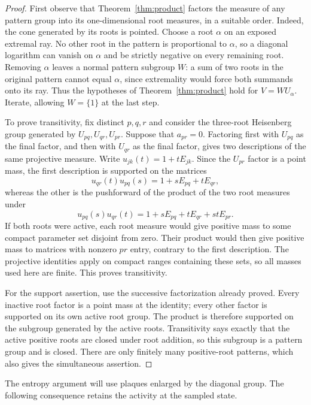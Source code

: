 \begin{proof}
First observe that Theorem~\ref{thm:product} factors the measure of any
pattern group into its one-dimensional root measures, in a suitable
order.  Indeed, the cone generated by its roots is pointed.  Choose a
root $\alpha$ on an exposed extremal ray.  No other root in the pattern
is proportional to $\alpha$, so a diagonal logarithm can vanish on
$\alpha$ and be strictly negative on every remaining root.  Removing
$\alpha$ leaves a normal pattern subgroup $W$: a sum of two roots in
the original pattern cannot equal $\alpha$, since extremality would
force both summands onto its ray.  Thus the hypotheses of
Theorem~\ref{thm:product} hold for $V=WU_\alpha$.  Iterate, allowing
$W=\{1\}$ at the last step.

To prove transitivity, fix distinct $p,q,r$ and consider the
three-root Heisenberg group generated by $U_{pq},U_{qr},U_{pr}$.
Suppose that $a_{pr}=0$.  Factoring first with $U_{pq}$ as the final
factor, and then with $U_{qr}$ as the final factor, gives two
descriptions of the same projective measure.  Write
$u_{jk}(t)=1+tE_{jk}$.  Since the $U_{pr}$ factor is a point mass, the
first description is supported on the matrices
\[
 u_{qr}(t)u_{pq}(s)=1+sE_{pq}+tE_{qr},
\]
whereas the other is the pushforward of the product of the two root
measures under
\[
 u_{pq}(s)u_{qr}(t)
     =1+sE_{pq}+tE_{qr}+stE_{pr}.
\]
If both roots were active, each root measure would give positive mass
to some compact parameter set disjoint from zero.  Their product would
then give positive mass to matrices with nonzero $pr$ entry, contrary
to the first description.  The projective identities apply on compact
ranges containing these sets, so all masses used here are finite.
This proves transitivity.

For the support assertion, use the successive factorization already
proved.  Every inactive root factor is a point mass at the identity;
every other factor is supported on its own active root group.  The
product is therefore supported on the subgroup generated by the active
roots.  Transitivity says exactly that the active positive roots are
closed under root addition, so this subgroup is a pattern group and is
closed.  There are only finitely many positive-root patterns, which
also gives the simultaneous assertion.
\end{proof}

The entropy argument will use plaques enlarged by the diagonal group.
The following consequence retains the activity at the sampled state.

